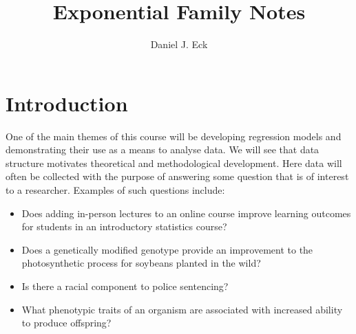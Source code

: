 \documentclass[
]{article}
\title{Exponential Family Notes}
\author{Daniel J. Eck}
\date{}
\begin{document}
\maketitle

\allowdisplaybreaks

\newcommand{\E}{\mathrm{E}}
\newcommand{\Var}{\mathrm{Var}}
\newcommand{\R}{\mathbb{R}}
\newcommand{\Prob}{\mathbb{P}}
\newcommand{\Proj}{\textbf{P}}
\newcommand{\Hcal}{\mathcal{H}}
\newcommand{\rootn}{\sqrt{n}}
\newcommand{\pibf}{\bm{\pi}}
\newcommand{\logit}{\text{logit}}

\newcommand{\norm}[1]{\left\lVert#1\right\rVert}
\newcommand{\indep}{\perp\!\!\!\perp}
\newcommand{\inner}[1]{\langle #1 \rangle}
\newcommand{\set}[1]{\{\, #1 \,\}}

\newtheorem{cor}{Corollary}
\newtheorem{lem}{Lemma}
\newtheorem{thm}{Theorem}
\newtheorem{defn}{Definition}
\newtheorem{prop}{Proposition}

\setcounter{page}{1}
\setcounter{equation}{0}

\newcommand\red[1]{{\color{red}#1}}

\allowdisplaybreaks

\tableofcontents

\hypertarget{introduction}{%
\section{Introduction}\label{introduction}}

One of the main themes of this course will be developing regression
models and demonstrating their use as a means to analyse data. We will
see that data structure motivates theoretical and methodological
development. Here data will often be collected with the purpose of
answering some question that is of interest to a researcher. Examples of
such questions include:

\begin{itemize}
\item Does adding in-person lectures to an online course improve learning outcomes for students in an introductory statistics course?
\item Does a genetically modified genotype provide an improvement to the photosynthetic process for soybeans planted in the wild?
\item Is there a racial component to police sentencing? 
\item What phenotypic traits of an organism are associated with increased ability to produce offspring?
\end{itemize}
\end{document}

